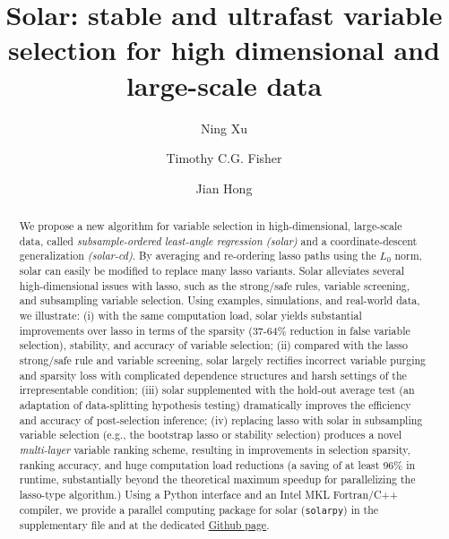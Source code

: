 \documentclass[11pt,review,authoryear]{elsarticle}
\begin{document}
\title{Solar: stable and ultrafast variable selection for high dimensional and large-scale data}

\author{Ning Xu}
\address{School of Economics, University of Sydney, Australia}

\author{Timothy C.G. Fisher}
\address{School of Economics, University of Sydney, Australia}

\author{Jian Hong}
\address{School of Economics, University of Sydney, Australia}



\begin{abstract}
  We propose a new algorithm for variable selection in high-dimensional, large-scale data, called \emph{subsample-ordered least-angle regression (solar)} and a coordinate-descent generalization \emph{(solar-cd)}. By averaging and re-ordering lasso paths using the $L_0$ norm, solar can easily be modified to replace many lasso variants. Solar alleviates several high-dimensional issues with lasso, such as the strong/safe rules, variable screening, and subsampling variable selection. Using examples, simulations, and real-world data, we illustrate: (i) with the same computation load, solar yields substantial improvements over lasso in terms of the sparsity (37-64\% reduction in false variable selection), stability, and accuracy of variable selection; (ii) compared with the lasso strong/safe rule and variable screening, solar largely rectifies incorrect variable purging and sparsity loss with complicated dependence structures and harsh settings of the irrepresentable condition; (iii) solar supplemented with the hold-out average test (an adaptation of data-splitting hypothesis testing) dramatically improves the efficiency and accuracy of post-selection inference; (iv) replacing lasso with solar in subsampling variable selection (e.g., the bootstrap lasso or stability selection) produces a novel \emph{multi-layer} variable ranking scheme, resulting in improvements in selection sparsity, ranking accuracy, and huge computation load reductions (a saving of at least 96\% in runtime, substantially beyond the theoretical maximum speedup for parallelizing the lasso-type algorithm.) Using a Python interface and an Intel MKL Fortran/C++ compiler, we provide a parallel computing package for solar (\texttt{solarpy}) in the supplementary file and at the dedicated \href{https://github.com/isaac2math/solarpy}{Github page}.
\end{abstract}
\end{document}
